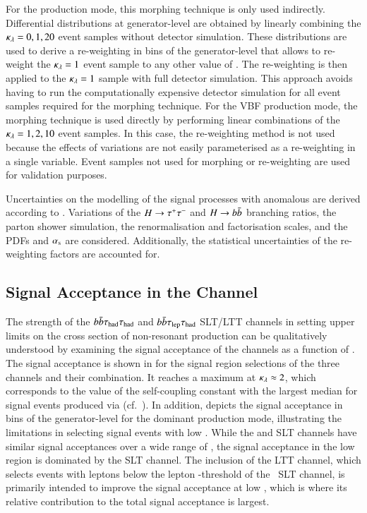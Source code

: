 For the \ggF production mode, this morphing technique is only used
indirectly. Differential distributions at generator-level are obtained
by linearly combining the $\kappa_{\lambda} = 0, 1, 20$ event samples without
detector simulation. These distributions are used to derive a
re-weighting in bins of the generator-level \mHH that allows to
re-weight the $\kappa_{\lambda} = 1$ event sample to any other value of
\klambda. The re-weighting is then applied to the $\kappa_{\lambda} = 1$
sample with full detector simulation. This approach avoids having to
run the computationally expensive detector simulation for all event
samples required for the morphing technique. For the VBF production
mode, the morphing technique is used directly by performing linear
combinations of the $\kappa_{\lambda} = 1, 2, 10$ event samples. In this case,
the re-weighting method is not used because the effects of \klambda
variations are not easily parameterised as a re-weighting in a single
variable. Event samples not used for morphing or re-weighting are used
for validation purposes.

Uncertainties on the modelling of the signal processes with anomalous
\klambda are derived according to .
Variations of the $H \to \tau^{+} \tau^{-}$ and $H \to b\bar{b}$ branching ratios,
the parton shower simulation, the renormalisation and factorisation
scales, and the PDFs and $\alpha_{\text{s}}$ are considered. Additionally, the
statistical uncertainties of the \klambda re-weighting factors are
accounted for.


\subsection{Signal Acceptance in the \bbtautau Channel}%
\label{sec:self_coupling_bbtt_limitations}

The strength of the $b\bar{b}\tau_{\text{had}}\tau_{\text{had}}$ and $b\bar{b}\tau_{\text{lep}}\tau_{\text{had}}$ SLT/LTT channels in
setting upper limits on the cross section of non-resonant \HH production can be
qualitatively understood by examining the signal acceptance of the channels as a
function of \klambda. The signal acceptance is shown in
 for the signal region selections of the three
channels and their combination. It reaches a maximum at $\kappa_{\lambda} \approx 2$,
which corresponds to the value of the self-coupling constant with the largest
median \mHH for signal events produced via \ggF
(cf.~). In addition, 
depicts the signal acceptance in bins of the generator-level \mHH for the
dominant \ggF production mode, illustrating the limitations in selecting signal
events with low \mHH. While the \hadhad and \lephad SLT channels have similar
signal acceptances over a wide range of \mHH, the signal acceptance in the low
\mHH region is dominated by the \lephad SLT channel. The inclusion of the
\lephad LTT channel, which selects events with leptons below the lepton
\pT-threshold of the \lephad~SLT channel, is primarily intended to improve the
signal acceptance at low \mHH, which is where its relative contribution to the
total signal acceptance is largest.

